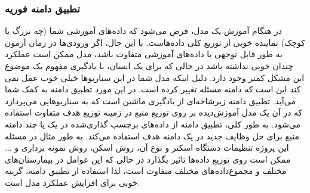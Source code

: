 \subsubsection{تطبیق دامنه فوریه}
در هنگام آموزش یک مدل، فرض می‌شود که داده‌های آموزشی شما (چه بزرگ یا کوچک) نماینده خوبی از توزیع کلی داده‌هاست.
با این حال، اگر ورودی‌ها در زمان آزمون به طور قابل توجهی با داده‌های آموزشی متفاوت باشد، مدل ممکن است عملکرد چندان خوبی نداشته باشد در حالی که برای یک انسان، با یادگیری مفهوم یک موضوع این مشکل کمتر وجود دارد.
دلیل اینکه مدل شما در این سناریوها خیلی خوب عمل نمی کند این است که دامنه مسئله تغییر کرده است. در این مورد تطبیق دامنه به کمک شما می‌آید. تطبیق دامنه زیرشاخه‌ای از یادگیری ماشین است که به سناریوهایی می‌پردازد که در آن یک مدل آموزش‌دیده بر روی توزیع منبع در زمینه توزیع هدف متفاوت استفاده می‌شود. به طور کلی، تطبیق دامنه از داده‌های برچسب گذاری‌شده در یک یا چند دامنه منبع برای حل وظایف جدید در یک دامنه هدف استفاده می‌کند.
\newline
به طور مثال در مسئله این پروژه تنظیمات دستگاه اسکنر و نوع آن، روش اسکن، روش نمونه برداری و ... ممکن است روی توزیع داده‌ها تاثیر بگذارد در حالی که این عوامل در بیمارستان‌های مختلف و مجموع‌داده‌های مختلف متفاوت است، لذا استفاده از تطبیق دامنه، گزینه خوبی برای افزایش عملکرد مدل است.

